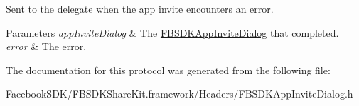 Sent to the delegate when the app invite encounters an error. 
\begin{DoxyParams}{Parameters}
{\em app\-Invite\-Dialog} & The \hyperlink{interface_f_b_s_d_k_app_invite_dialog}{F\-B\-S\-D\-K\-App\-Invite\-Dialog} that completed. \\
\hline
{\em error} & The error. \\
\hline
\end{DoxyParams}


The documentation for this protocol was generated from the following file\-:\begin{DoxyCompactItemize}
\item 
Facebook\-S\-D\-K/\-F\-B\-S\-D\-K\-Share\-Kit.\-framework/\-Headers/F\-B\-S\-D\-K\-App\-Invite\-Dialog.\-h\end{DoxyCompactItemize}
